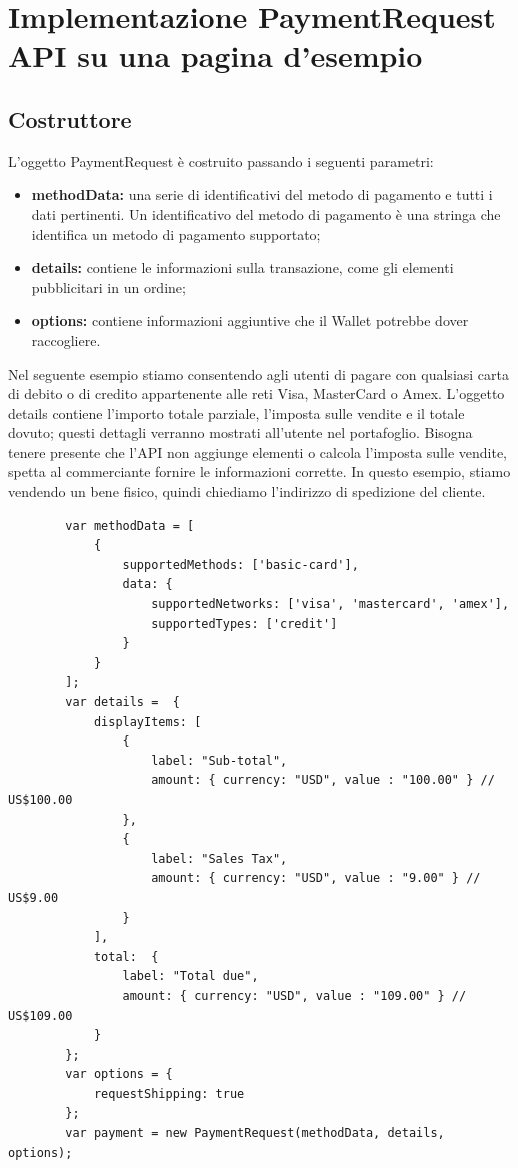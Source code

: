 \documentclass[italian]{article}
\begin{document}
	\section{Implementazione PaymentRequest API su una pagina d'esempio}
	\subsection{Costruttore}
	L'oggetto PaymentRequest è costruito passando i seguenti parametri:
	\begin{itemize}
	\item \textbf{methodData:} una serie di identificativi del metodo di pagamento e tutti i dati pertinenti. Un identificativo del metodo di pagamento è una stringa che identifica un metodo di pagamento supportato;
	\item \textbf{details:} contiene le informazioni sulla transazione, come gli elementi pubblicitari in un ordine;
	\item \textbf{options:} contiene informazioni aggiuntive che il Wallet potrebbe dover raccogliere.
	\end{itemize}

	Nel seguente esempio stiamo consentendo agli utenti di pagare con qualsiasi carta di debito o di credito appartenente alle reti Visa, MasterCard o Amex. L'oggetto details contiene l'importo totale parziale, l'imposta sulle vendite e il totale dovuto; questi dettagli verranno mostrati all'utente nel portafoglio. Bisogna tenere presente che l'API non aggiunge elementi o calcola l'imposta sulle vendite, spetta al commerciante fornire le informazioni corrette. In questo esempio, stiamo vendendo un bene fisico, quindi chiediamo l'indirizzo di spedizione del cliente.

	\begin{lstlisting}
		var methodData = [
			{     
				supportedMethods: ['basic-card'],     
				data: {          
					supportedNetworks: ['visa', 'mastercard', 'amex'],
					supportedTypes: ['credit']                 
				}    
			}     
		];
		var details =  {
			displayItems: [
				{
					label: "Sub-total",
					amount: { currency: "USD", value : "100.00" } // US$100.00
				},
				{
					label: "Sales Tax",
					amount: { currency: "USD", value : "9.00" } // US$9.00
				}
			],
			total:  {
				label: "Total due",
				amount: { currency: "USD", value : "109.00" } // US$109.00
			}
		};	
		var options = {
			requestShipping: true 
		};
		var payment = new PaymentRequest(methodData, details, options);
	\end{lstlisting}
	
\end{document}
